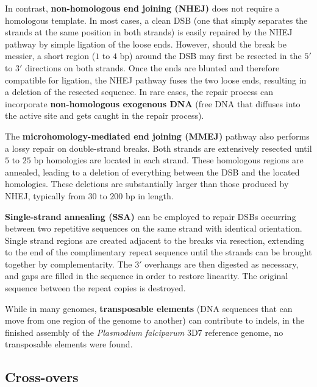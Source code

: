 In contrast, \textbf{non-homologous end joining (NHEJ)} does not require a homologous template.  In most cases, a clean DSB (one that simply separates the strands at the same position in both strands) is easily repaired by the NHEJ pathway by simple ligation of the loose ends.  However, should the break be messier, a short region ($1$ to $4$ bp) around the DSB may first be resected in the $5'$ to $3'$ directions on both strands.  Once the ends are blunted and therefore compatible for ligation, the NHEJ pathway fuses the two loose ends, resulting in a deletion of the resected sequence\cite{Lieber:2008dn}.  In rare cases, the repair process can incorporate \textbf{non-homologous exogenous DNA} (free DNA that diffuses into the active site and gets caught in the repair process)\cite{HavivChesner:2007gm}.

The \textbf{microhomology-mediated end joining (MMEJ)} pathway also performs a lossy repair on double-strand breaks\cite{McVey:2008kp}.  Both strands are extensively resected until $5$ to $25$ bp homologies are located in each strand.  These homologous regions are annealed, leading to a deletion of everything between the DSB and the located homologies.  These deletions are substantially larger than those produced by NHEJ, typically from $30$ to $200$ bp in length\cite{Kent:2015jg}.

\textbf{Single-strand annealing (SSA)} can be employed to repair DSBs occurring between two repetitive sequences on the same strand with identical orientation\cite{Lin:1984uf}.  Single strand regions are created adjacent to the breaks via resection, extending to the end of the complimentary repeat sequence until the strands can be brought together by complementarity.  The $3'$ overhangs are then digested as necessary, and gaps are filled in the sequence in order to restore linearity.  The original sequence between the repeat copies is destroyed.

While in many genomes, \textbf{transposable elements} (DNA sequences that can move from one region of the genome to another) can contribute to indels, in the finished assembly of the \textit{Plasmodium falciparum} 3D7 reference genome, no transposable elements were found\cite{Gardner:2002p1564,Rebollo:2012js,Biemont:2006km}.

\subsection{Cross-overs}

